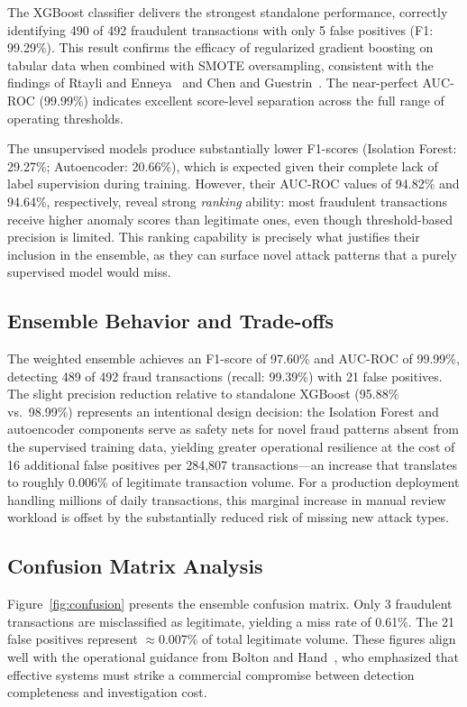\documentclass[conference,10pt]{IEEEtran}
\begin{document}
The XGBoost classifier delivers the strongest standalone performance, correctly identifying 490 of 492 fraudulent transactions with only 5 false positives (F1: 99.29\%). This result confirms the efficacy of regularized gradient boosting on tabular data when combined with SMOTE oversampling, consistent with the findings of Rtayli and Enneya~\cite{rtayli2020enhanced} and Chen and Guestrin~\cite{chen2016xgboost}. The near-perfect AUC-ROC (99.99\%) indicates excellent score-level separation across the full range of operating thresholds.

The unsupervised models produce substantially lower F1-scores (Isolation Forest: 29.27\%; Autoencoder: 20.66\%), which is expected given their complete lack of label supervision during training. However, their AUC-ROC values of 94.82\% and 94.64\%, respectively, reveal strong \emph{ranking} ability: most fraudulent transactions receive higher anomaly scores than legitimate ones, even though threshold-based precision is limited. This ranking capability is precisely what justifies their inclusion in the ensemble, as they can surface novel attack patterns that a purely supervised model would miss.

\subsection{Ensemble Behavior and Trade-offs}
The weighted ensemble achieves an F1-score of 97.60\% and AUC-ROC of 99.99\%, detecting 489 of 492 fraud transactions (recall: 99.39\%) with 21 false positives. The slight precision reduction relative to standalone XGBoost (95.88\% vs.\ 98.99\%) represents an intentional design decision: the Isolation Forest and autoencoder components serve as safety nets for novel fraud patterns absent from the supervised training data, yielding greater operational resilience at the cost of 16 additional false positives per 284,807 transactions---an increase that translates to roughly 0.006\% of legitimate transaction volume. For a production deployment handling millions of daily transactions, this marginal increase in manual review workload is offset by the substantially reduced risk of missing new attack types.

\subsection{Confusion Matrix Analysis}
Figure~\ref{fig:confusion} presents the ensemble confusion matrix. Only 3 fraudulent transactions are misclassified as legitimate, yielding a miss rate of 0.61\%. The 21 false positives represent $\approx$0.007\% of total legitimate volume. These figures align well with the operational guidance from Bolton and Hand~\cite{bolton2002statistical}, who emphasized that effective systems must strike a commercial compromise between detection completeness and investigation cost.
\end{document}
